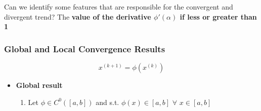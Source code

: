 Can we identify some features that are responsible for the convergent and divergent trend? The \textbf{value of the derivative $\phi'(\alpha)$ if less or greater than 1}

\pagebreak
\subsubsection{Global and Local Convergence Results}
$$x^{(k+1)}=\phi(x^{(k)})$$
\begin{itemize}
    \item \textbf{Global result}
    \begin{enumerate}
        \item Let $\phi\in C^0([a,b])$ and s.t. $\phi(x)\in[a,b]\,\,\forall\,\,x\in[a,b]$\\
        \begin{figure}[!ht]
            \begin{minipage}{\linewidth}
                \centering
            \end{minipage}
        \end{figure}
        

\end{enumerate}
\end{itemize}
